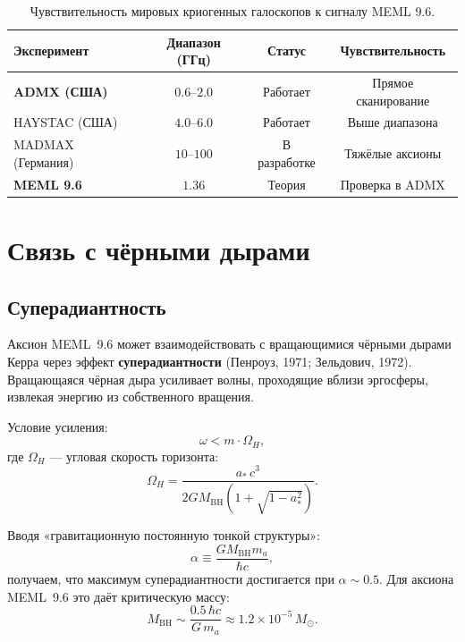 \documentclass[12pt,a4paper]{article}
\begin{document}
\begin{table}[h!]
\centering
\caption{Чувствительность мировых криогенных галоскопов к сигналу MEML 9.6.}
\label{tab:haloscopes}
\begin{tabular}{lccc}
\toprule
\textbf{Эксперимент} & \textbf{Диапазон (ГГц)} & \textbf{Статус} & \textbf{Чувствительность} \\
\midrule
\textbf{ADMX (США)} & $0.6$--$2.0$ & Работает & Прямое сканирование \\
HAYSTAC (США) & $4.0$--$6.0$ & Работает & Выше диапазона \\
MADMAX (Германия) & $10$--$100$ & В разработке & Тяжёлые аксионы \\
\midrule
\textbf{MEML 9.6} & $\mathbf{1.36}$ & Теория & Проверка в ADMX \\
\bottomrule
\end{tabular}
\end{table}

\section{Связь с чёрными дырами}
\label{sec:black-holes}

\subsection{Суперадиантность}

Аксион MEML~9.6 может взаимодействовать с вращающимися чёрными дырами Керра через эффект \textbf{суперадиантности} (Пенроуз, 1971; Зельдович, 1972). Вращающаяся чёрная дыра усиливает волны, проходящие вблизи эргосферы, извлекая энергию из собственного вращения.

Условие усиления:
\begin{equation}
\omega < m \cdot \Omega_H,
\end{equation}
где $\Omega_H$ --- угловая скорость горизонта:
\begin{equation}
\Omega_H = \frac{a_*\,c^3}{2GM_{\text{BH}}\left(1 + \sqrt{1-a_*^2}\right)}.
\end{equation}

Вводя «гравитационную постоянную тонкой структуры»:
\begin{equation}
\alpha \equiv \frac{G M_{\text{BH}} m_a}{\hbar c},
\end{equation}
получаем, что максимум суперадиантности достигается при $\alpha \sim 0.5$. Для аксиона MEML~9.6 это даёт критическую массу:
\begin{equation}
\boxed{\; M_{\text{BH}} \sim \frac{0.5\,\hbar c}{G\,m_a}
\approx 1.2 \times 10^{-5}\,M_\odot. \;}
\end{equation}
\end{document}

